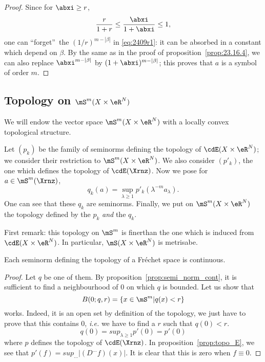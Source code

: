\begin{proof}
	Since for $\abxi\geq r$,
	\[
		\frac{r}{1+r}\leq\frac{\abxi}{1+\abxi}\leq 1,
	\]
	one can ``forget''\ the $(1/r)^{m-|\beta|}$ in \eqref{eq:2409r1}: it can be absorbed in a constant which depend on $\beta$. By the same as in the proof of proposition~\ref{prop:23.16.4}, we can also replace $\abxi^{m-|\beta|}$ by $(1+\abxi)^{m-|\beta|}$; this proves that $a$ is a symbol of order $m$.

\end{proof}

\subsection{Topology on \texorpdfstring{$\mS^m(X\times\eR^N)$}{SmXRN}}

We will endow the vector space $\mS^m(X\times\eR^N)$ with a locally convex topological structure.

Let $(p_k)$ be the family of seminorms defining the topology of $\cdE(X\times\eR^N)$; we consider their restriction to $\mS^m(X\times\eR^N)$. We also consider $(p'_k)$, the one which defines the topology of $\cdE(\Xrnz)$. Now we pose for $a\in\mS^m(\Xrnz)$,
\[
	q_k(a)=\sup_{\lambda\geq 1}p'_k(\lambda^{-m}a_{\lambda}).
\]
One can see that these $q_k$ are seminorms. Finally, we put on $\mS^m(X\times\eR^N)$ the topology defined by the $p_k$ \emph{and} the $q_k$.

First remark: this topology on $\mS^m$ is finer\angl than the one which is induced from $\cdE(X\times\eR^N)$. In particular, $\mS(X\times\eR^N)$ is metrisabe\angl.

\begin{lemma}
	Each seminorm defining the topology of a Fréchet space is continuous.
	\label{lem:q_cont}
\end{lemma}
\begin{proof}
	Let $q$ be one of them. By proposition~\ref{prop:semi_norm_cont}, it is sufficient to find a neighbourhood of $0$ on which $q$ is bounded. Let us show that
	\[
		B(0;q,r)=\{x\in\mS^m|q(x)<r\}
	\]
	works. Indeed, it is an open set by definition of the topology, we just have to prove that this contains $0$, \emph{i.e.} we have to find a $r$ such that $q(0)<r$.
	\[
		q(0)=sup_{\lambda\geq 1}p'(0)=p'(0)
	\]
	where $p$ defines the topology of $\cdE(\Xrnz)$. In proposition~\ref{prop:topo_E}, we see that $p'(f)=sup_{\ldots}|(D^{\ldots}f)(x)|$. It is clear that this is zero when $f\equiv 0$.


\end{proof}

